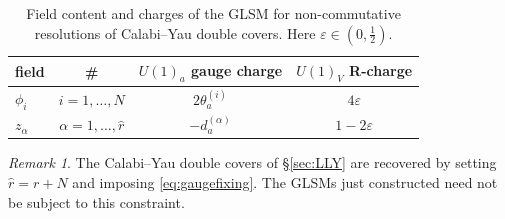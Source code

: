 \documentclass[12pt,a4paper,oneside]{amsart}
\numberwithin{equation}{section}
\theoremstyle{definition}
\theoremstyle{remark}
\newtheorem{rmk}[thm]{Remark}
\begin{document}
\begin{table}[th]
\centering
\begin{tabular}{l |c |c | c}
	field & \# & $U(1)_a$ gauge charge & $U(1)_V$ R-charge \\
	\hline
	$\phi_i$ & $i=1, \dots, N$ & $2 \theta_a ^{(i)}$ & $4\varepsilon$ \\
	$z_{\alpha}$ & $\alpha=1, \dots, \hat{r}$ & $- d_a^{(\alpha)}$ & $1-2\varepsilon$\\
	\hline
\end{tabular}
\caption{Field content and charges of the GLSM for non-commutative resolutions of Calabi--Yau double covers. Here $\varepsilon\in \left(0,\frac{1}{2}\right)$.}
\label{tab:GLSMdoublenew}
\end{table}\par

\begin{rmk} The Calabi--Yau double covers of \S\ref{sec:LLY} are recovered by setting $\hat{r}=r+N$ and imposing \eqref{eq:gaugefixing}. The GLSMs just constructed need not be subject to this constraint.
 \end{rmk}
\end{document}
